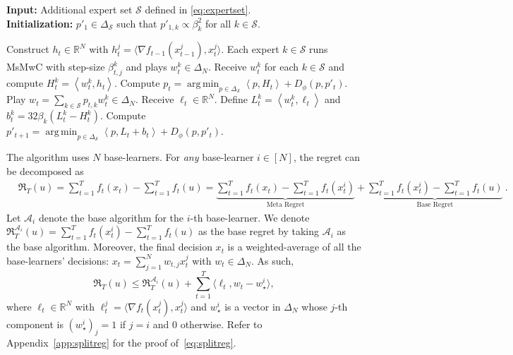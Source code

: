\documentclass{article}
\theoremstyle{plain}
\theoremstyle{definition}
\theoremstyle{remark}
\DeclareMathOperator*{\argmin}{arg\,min}
\newcommand{\cA}{\mathcal{A}}
\newcommand{\cS}{\mathcal{S}}
\newcommand{\regret}{\mathfrak{R}}
\newcommand{\real}{\mathbb{R}}
\newcommand{\inner}[2]{\left\langle #1, #2 \right\rangle}
\begin{document}
\begin{algorithm}[!t]
\caption{Meta Algorithm}
\label{alg:meta}
\textbf{Input:} Additional expert set $\cS$ defined in \eqref{eq:expertset}.\\
\textbf{Initialization:} $p'_1\in\Delta_{\cS}$ such that $p'_{1,k} \propto \beta_k^2$ for all $ k\in\cS$.
\begin{algorithmic}[1]
    \STATE Construct $h_t\in\real^N$ with $h_t^j=\langle \nabla f_{t-1}(x_{t-1}^j), x_t^j \rangle$.
    \STATE Each expert $k\in\cS$ runs MsMwC with step-size $\beta_{t,j}^k$ and plays $w_t^k\in\Delta_N$.
    \STATE Receive $w_t^k$ for each $k\in\cS$ and compute $H_{t}^k=\inner{w_t^k}{h_t}$.
    \STATE Compute $p_t=\argmin_{p\in\Delta_{\cS}}\inner{p}{H_t}+D_{\phi}(p,p'_t)$.
    \STATE Play $w_t=\sum_{k\in\cS}p_{t,k}w_t^k\in\Delta_N$.
    \STATE Receive $\ell_t\in\real^N$. Define $L_{t}^k=\inner{w_t^k}{\ell_t}$ and $b_t^k=32\beta_k(L_{t}^k-H_{t}^k)$.
    \STATE Compute $p'_{t+1}=\argmin_{p\in\Delta_{\cS}}\inner{p}{L_t+b_t}+D_{\phi}(p,p'_t)$.
    \ENDFOR
\end{algorithmic}
\end{algorithm}


The algorithm uses $N$ base-learners. For \emph{any} base-learner $i \in [N]$, the regret can be decomposed as
\begin{align*}
&\regret_T(u)=\sum_{t=1}^T f_t(x_t) - \sum_{t=1}^T f_t(u)= \underbrace{\sum_{t=1}^T f_t(x_t) - \sum_{t=1}^T f_t(x_t^i)}_{\text{Meta Regret}} + \underbrace{\sum_{t=1}^T f_t(x_t^i) - \sum_{t=1}^T f_t(u)}_{\text{Base Regret}}~.
\end{align*}
Let $\cA_i$ denote the base algorithm for the $i$-th base-learner. We denote  $\regret_T^{\cA_i}(u)=\sum_{t=1}^T f_t(x_t^i) - \sum_{t=1}^T f_t(u)$ as the base regret by taking $\cA_i$ as the base algorithm.  Moreover, the final decision $x_{t}$ is a weighted-average of all the base-learners' decisions: $
x_{t} = \sum_{j=1}^N w_{t,j} x_{t}^j$ with $w_t\in\Delta_N$.
As such,
\begin{equation}\label{eq:splitreg}
\regret_T(u)\leq\regret_T^{\cA_i}(u)+\sum_{t=1}^T\langle \ell_t, w_t-w_\star^i\rangle,
\end{equation}
where $\ell_t\in\mathbb{R}^N$ with $\ell_t^j=\langle \nabla f_t(x_t^j),x_t^j\rangle$ and $w_{\star}^i$ is a  vector in $\Delta_N$ whose $j$-th component is $(w_{\star}^i)_j=1$ if $j=i$ and $0$ otherwise.  Refer to Appendix~\ref{app:splitreg} for the proof of~\eqref{eq:splitreg}.
\end{document}
